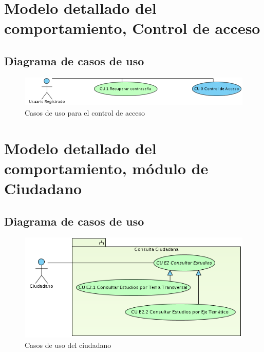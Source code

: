 \documentclass[10pt]{book}
\begin{document}
\chapter{Modelo detallado del comportamiento, Control de acceso} 

\section{Diagrama de casos de uso}

\begin{figure}[htbp!]
	\begin{center}
		\includegraphics[width=1.0\textwidth]{images/CUcontrolAcceso}
		\caption{Casos de uso para el control de acceso}
		\label{fig:default}
	\end{center}
\end{figure}


\chapter{Modelo detallado del comportamiento, módulo de Ciudadano} 

\section{Diagrama de casos de uso}

\begin{figure}[htbp!]
	\begin{center}
		\includegraphics[width=.8\textwidth]{images/CUciudadano}
		\caption{Casos de uso del ciudadano}
		\label{fig:default}
	\end{center}
\end{figure}
\end{document}
